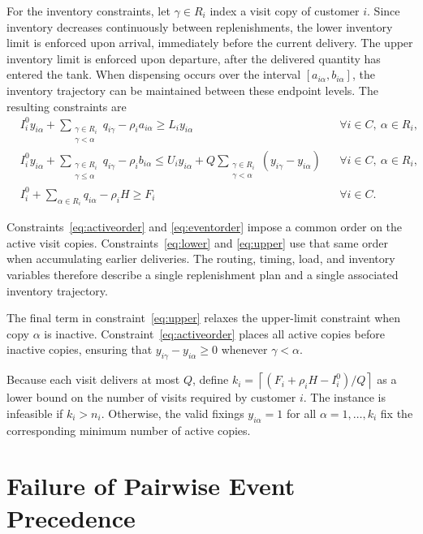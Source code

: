 \documentclass[10pt]{article}
\begin{document}
For the inventory constraints, let $\gamma\in R_i$ index a visit copy of customer $i$. Since inventory decreases continuously between replenishments, the lower inventory limit is enforced upon arrival, immediately before the current delivery. The upper inventory limit is enforced upon departure, after the delivered quantity has entered the tank. When dispensing occurs over the interval $[a_{i\alpha},b_{i\alpha}]$, the inventory trajectory can be maintained between these endpoint levels. The resulting constraints are
\begin{align}
&I_i^0y_{i\alpha}
+
\sum_{\substack{\gamma\in R_i\\\gamma<\alpha}}
q_{i\gamma}
-
\rho_i a_{i\alpha}
\ge
L_i y_{i\alpha}
&&\forall i\in C,\ \alpha\in R_i,
\label{eq:lower}\\
&I_i^0y_{i\alpha}
+
\sum_{\substack{\gamma\in R_i\\\gamma\le\alpha}}
q_{i\gamma}
-
\rho_i b_{i\alpha}
\le
U_i y_{i\alpha}
+
Q
\sum_{\substack{\gamma\in R_i\\\gamma<\alpha}}
(y_{i\gamma}-y_{i\alpha})
&&\forall i\in C,\ \alpha\in R_i,
\label{eq:upper}\\
&I_i^0
+
\sum_{\alpha\in R_i}q_{i\alpha}
-
\rho_iH
\ge
F_i
&&\forall i\in C.
\label{eq:terminal}
\end{align}

Constraints~\eqref{eq:activeorder} and \eqref{eq:eventorder} impose a common order on the active visit copies. Constraints~\eqref{eq:lower} and \eqref{eq:upper} use that same order when accumulating earlier deliveries. The routing, timing, load, and inventory variables therefore describe a single replenishment plan and a single associated inventory trajectory.

The final term in constraint~\eqref{eq:upper} relaxes the upper-limit constraint when copy $\alpha$ is inactive. Constraint~\eqref{eq:activeorder} places all active copies before inactive copies, ensuring that $y_{i\gamma}-y_{i\alpha}\ge0$ whenever $\gamma<\alpha$.

Because each visit delivers at most $Q$, define $k_i=\left\lceil(F_i+\rho_iH-I_i^0)/Q\right\rceil$ as a lower bound on the number of visits required by customer $i$. The instance is infeasible if $k_i>n_i$. Otherwise, the valid fixings $y_{i\alpha}=1$ for all $\alpha=1,\ldots,k_i$ fix the corresponding minimum number of active copies.

\section{Failure of Pairwise Event Precedence}
\end{document}
